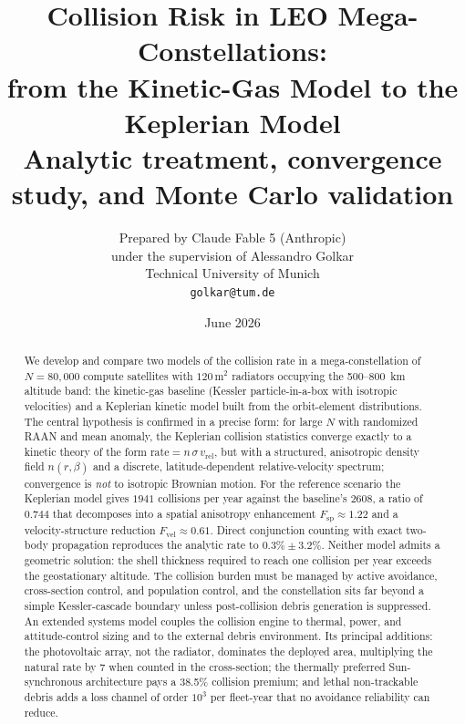 \documentclass[11pt,a4paper]{article}
\title{Collision Risk in LEO Mega-Constellations:\\
from the Kinetic-Gas Model to the Keplerian Model\\
\large Analytic treatment, convergence study, and Monte Carlo validation}
\author{Prepared by Claude Fable 5 (Anthropic)\\
under the supervision of Alessandro Golkar\\
Technical University of Munich \\ \texttt{golkar@tum.de}}
\date{June 2026}
\newcommand{\vrel}{v_{\mathrm{rel}}}
\begin{document}
\maketitle

\begin{center}
\end{center}

\begin{abstract}
We develop and compare two models of the collision rate in a mega-constellation of
$N = 80{,}000$ compute satellites with $120\,\mathrm{m}^2$ radiators occupying the
500--800~km altitude band: the kinetic-gas baseline (Kessler particle-in-a-box with
isotropic velocities) and a Keplerian kinetic model built from the orbit-element
distributions. The central hypothesis is confirmed in a precise form: for large $N$
with randomized RAAN and mean anomaly, the Keplerian collision statistics converge
exactly to a kinetic theory of the form $\mathrm{rate} = n\,\sigma\,\vrel$, but with a
structured, anisotropic density field $n(r,\beta)$ and a discrete, latitude-dependent
relative-velocity spectrum; convergence is \emph{not} to isotropic Brownian motion.
For the reference scenario the Keplerian model gives $1941$ collisions per year against
the baseline's $2608$, a ratio of $0.744$ that decomposes into a spatial anisotropy
enhancement $F_{\mathrm{sp}} \approx 1.22$ and a velocity-structure reduction
$F_{\mathrm{vel}} \approx 0.61$. Direct conjunction counting with exact two-body
propagation reproduces the analytic rate to $0.3\% \pm 3.2\%$. Neither model admits a
geometric solution: the shell thickness required to reach one collision per year exceeds
the geostationary altitude. The collision burden must be managed by active avoidance,
cross-section control, and population control, and the constellation sits far beyond a
simple Kessler-cascade boundary unless post-collision debris generation is suppressed.
An extended systems model couples the collision engine to thermal, power, and
attitude-control sizing and to the external debris environment. Its principal additions:
the photovoltaic array, not the radiator, dominates the deployed area, multiplying the
natural rate by 7 when counted in the cross-section; the thermally preferred
Sun-synchronous architecture pays a 38.5\% collision premium; and lethal non-trackable
debris adds a loss channel of order $10^3$ per fleet-year that no avoidance reliability
can reduce.
\end{abstract}
\end{document}
